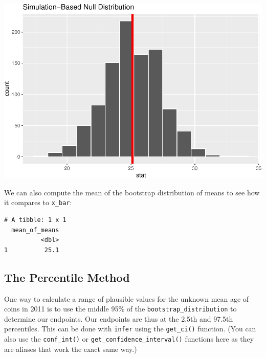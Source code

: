 \documentclass[]{article}
\newenvironment{Shaded}{\begin{snugshade}}{\end{snugshade}}
\newcommand{\KeywordTok}[1]{\textcolor[rgb]{0.13,0.29,0.53}{\textbf{#1}}}
\newcommand{\DataTypeTok}[1]{\textcolor[rgb]{0.13,0.29,0.53}{#1}}
\newcommand{\FloatTok}[1]{\textcolor[rgb]{0.00,0.00,0.81}{#1}}
\newcommand{\StringTok}[1]{\textcolor[rgb]{0.31,0.60,0.02}{#1}}
\newcommand{\OperatorTok}[1]{\textcolor[rgb]{0.81,0.36,0.00}{\textbf{#1}}}
\newcommand{\NormalTok}[1]{#1}
\begin{document}
\includegraphics{DAWeek7_files/figure-latex/visualize2-1.pdf}

We can also compute the mean of the bootstrap distribution of means to
see how it compares to \texttt{x\_bar}:

\begin{Shaded}
\end{Shaded}

\begin{verbatim}
# A tibble: 1 x 1
  mean_of_means
          <dbl>
1          25.1
\end{verbatim}

\subsection{The Percentile Method}\label{the-percentile-method}

One way to calculate a range of plausible values for the unknown mean
age of coins in 2011 is to use the middle 95\% of the
\texttt{bootstrap\_distribution} to determine our endpoints. Our
endpoints are thus at the 2.5th and 97.5th percentiles. This can be done
with \texttt{infer} using the \texttt{get\_ci()} function. (You can also
use the \texttt{conf\_int()} or \texttt{get\_confidence\_interval()}
functions here as they are aliases that work the exact same way.)

\begin{Shaded}
\end{Shaded}
\end{document}
